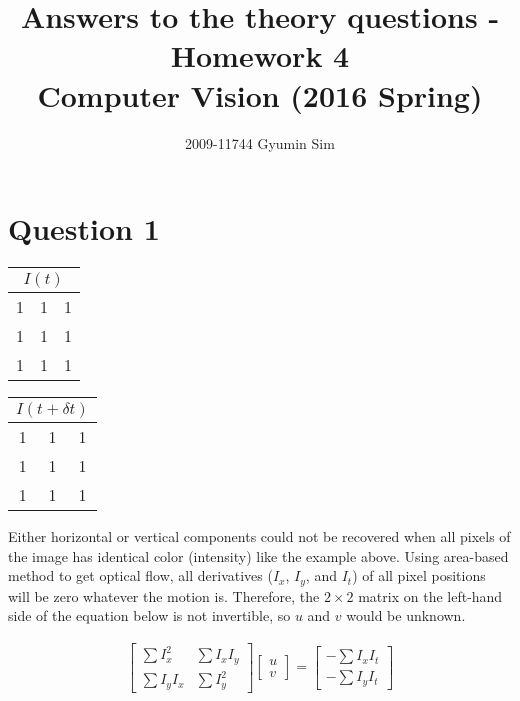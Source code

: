 \documentclass[a4paper,10pt]{article}
\begin{document}
\title{Answers to the theory questions - Homework 4 \\
  \large Computer Vision (2016 Spring)}
\author{2009-11744 Gyumin Sim}
\maketitle

\section*{Question 1}

\begin{table}[H]
\centering
\begin{tabular}{|c|c|c|}
\multicolumn{3}{c}{$I(t)$} \\
\hline
1 & 1 & 1 \\
\hline
1 & 1 & 1 \\
\hline
1 & 1 & 1 \\
\hline
\end{tabular}
\quad
\begin{tabular}{|c|c|c|}
\multicolumn{3}{c}{$I(t + \delta t)$} \\
\hline
1 & 1 & 1 \\
\hline
1 & 1 & 1 \\
\hline
1 & 1 & 1 \\
\hline
\end{tabular}
\end{table}

Either horizontal or vertical components could not be recovered
when all pixels of the image has identical color (intensity) like the example above.
Using area-based method to get optical flow,
all derivatives ($I_x$, $I_y$, and $I_t$) of all pixel positions will be zero whatever the motion is.
Therefore, the $2 \times 2$ matrix on the left-hand side of the equation below is not invertible,
so $u$ and $v$ would be unknown.

\begin{align*}
\begin{bmatrix}
\sum\nolimits I_x^2 & \sum\nolimits I_x I_y \\
\sum\nolimits I_y I_x & \sum\nolimits I_y^2
\end{bmatrix}
\begin{bmatrix}
u \\
v
\end{bmatrix}
=
\begin{bmatrix}
- \sum\nolimits I_x I_t \\
- \sum\nolimits I_y I_t
\end{bmatrix}
\end{align*}
\end{document}
